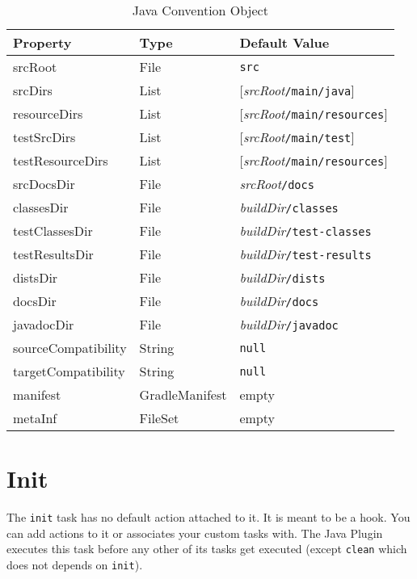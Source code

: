 \begin{table}[h]
	\begin{center}
		\begin{tabular}{|l|l|l|} \hline
			\textbf{Property} & \textbf{Type} & \textbf{Default Value} \\ \hline
			srcRoot & File & \texttt{src} \\ \hline
			srcDirs & List & [\emph{srcRoot}\texttt{/main/java}] \\ \hline
			resourceDirs & List & [\emph{srcRoot}\texttt{/main/resources}]\\ \hline
			testSrcDirs & List & [\emph{srcRoot}\texttt{/main/test}] \\ \hline
			testResourceDirs & List & [\emph{srcRoot}\texttt{/main/resources}] \\ \hline
			srcDocsDir & File & \emph{srcRoot}\texttt{/docs} \\ \hline
			classesDir & File & \emph{buildDir}\texttt{/classes} \\ \hline
			testClassesDir & File & \emph{buildDir}\texttt{/test-classes} \\ \hline
			testResultsDir & File & \emph{buildDir}\texttt{/test-results} \\ \hline
			distsDir & File & \emph{buildDir}\texttt{/dists} \\ \hline
			docsDir & File & \emph{buildDir}\texttt{/docs} \\ \hline
			javadocDir & File & \emph{buildDir}\texttt{/javadoc} \\ \hline
			sourceCompatibility & String & \texttt{null} \\ \hline
			targetCompatibility & String & \texttt{null} \\ \hline
			manifest & GradleManifest & empty \\ \hline
			metaInf & FileSet & empty \\ \hline
		\end{tabular}
	\end{center}
	\caption{Java Convention Object}
	\label{javaconvention}
\end{table}

\section{Init} %
\label{sec:initialization}
The \texttt{init} task has no default action attached to it. It is meant to be a hook. You can add actions to it or associates your custom tasks with. The Java Plugin executes this task before any other of its tasks get executed (except \texttt{clean} which does not depends on \texttt{init}).

